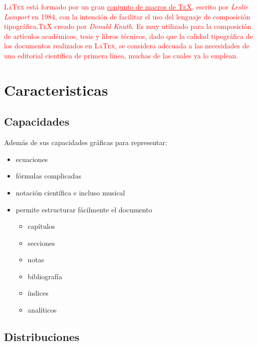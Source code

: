 \documentclass[spanish,12pt,letterpaper]{article}
\begin{document}
\scriptsize\textcolor{red}{\textsc{LaTex} está formado por un gran \underline{conjunto de macros de \textsc{TeX}}, escrito por \textsl{Leslie Lamport} en 1984, con la intención de facilitar el uso del lenguaje de composición tipográfica,\textsc{TeX} creado por \textit{Donald Knuth}. Es muy utilizado para la composición de artículos académicos, tesis y libros técnicos, dado que la calidad tipográfica de los documentos realizados en \textsc{LaTex}, se considera adecuada a las necesidades de una editorial científica de primera línea, muchas de las cuales ya lo emplean\cite{AgirreBook}.}\\


\section{Caracteristicas}
\subsection{Capacidades}
Además de sus capacidades gráficas para representar: 
\begin{itemize}
    \item ecuaciones
    \item fórmulas complicadas
    \item notación científica e incluso musical
    \item permite estructurar fácilmente el documento \begin{itemize}
        \item capítulos
        \item secciones
        \item notas
        \item bibliografía
        \item índices 
        \item analíticos
    \end{itemize}
\end{itemize}

\subsection{Distribuciones}
\end{document}
